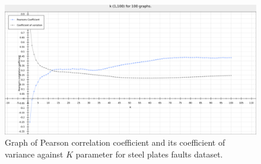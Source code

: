 \begin{figure}[h!]
  \centering
  \captionsetup{justification=centering}
    \includegraphics[width=1.05\textwidth]{images/k100_faults.png}
  \caption{Graph of Pearson correlation coefficient and its coefficient of variance against $K$ parameter for steel plates faults dataset.}
  \label{fig:graph_faults}
\end{figure}
